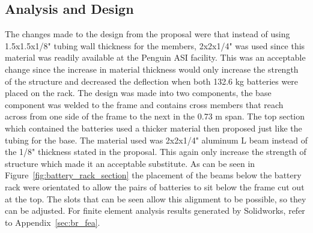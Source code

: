 \subsection{Analysis and Design}
The changes made to the design from the proposal were that instead of using 1.5x1.5x1/8" tubing wall thickness for the members, 2x2x1/4" was used since this material was readily available at the Penguin ASI facility. This was an acceptable change since the increase in material thickness would only increase the strength of the structure and decreased the deflection when both 132.6 kg batteries were placed on the rack. The design was made into two components, the base component was welded to the frame and contains cross members that reach across from one side of the frame to the next in the 0.73 m span. The top section which contained the batteries used a thicker material then proposed just like the tubing for the base. The material used was 2x2x1/4" aluminum L beam instead of the 1/8" thickness stated in the proposal. This again only increase the strength of structure which made it an acceptable substitute. As can be seen in Figure~\ref{fig:battery_rack_section} the placement of the beams below the battery rack were orientated to allow the pairs of batteries to sit below the frame cut out at the top. The slots that can be seen allow this alignment to be possible, so they can be adjusted. For finite element analysis results generated by Solidworks, refer to Appendix~\ref{sec:br_fea}.




